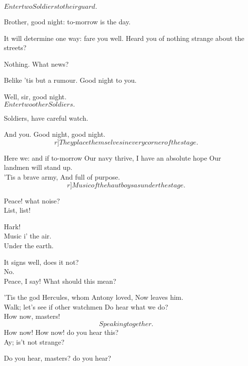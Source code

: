 \documentclass{book}
\begin{document}
	\(Enter two Soldiers to their guard.\)

	Brother, good night: to-morrow is the day.

	It will determine one way: fare you well.
	Heard you of nothing strange about the streets?

	Nothing. What news?

	Belike 'tis but a rumour. Good night to you.

	Well, sir, good night. \\

	\(Enter two other Soldiers.\)

	Soldiers, have careful watch.

	And you. Good night, good night. \[r]They place themselves in every corner of the stage.\]

	Here we: and if to-morrow
	Our navy thrive, I have an absolute hope
	Our landmen will stand up. \\

	'Tis a brave army,
	And full of purpose. \\  \[r]Music of the hautboys as under the stage.\]

	Peace! what noise? \\

	List, list!

	Hark! \\

	    Music i' the air. \\

 	Under the earth.

	It signs well, does it not? \\

	No. \\

	Peace, I say!
	What should this mean?

	'Tis the god Hercules, whom Antony loved,
	Now leaves him. \\

	Walk; let's see if other watchmen
	Do hear what we do? \\

	How now, masters! \\

	\[Speaking together.\]  How now!
	How now! do you hear this? \\

	Ay; is't not strange?

	Do you hear, masters? do you hear?
\end{document}
